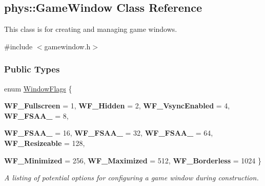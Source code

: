 \hypertarget{classphys_1_1GameWindow}{
\subsection{phys::GameWindow Class Reference}
\label{dc/d4f/classphys_1_1GameWindow}
}


This class is for creating and managing game windows.  




{\ttfamily \#include $<$gamewindow.h$>$}

\subsubsection*{Public Types}
\begin{DoxyCompactItemize}
\item 
enum \hyperlink{classphys_1_1GameWindow_ae4c6f1cc436ac9f20e43bd21a99885f5}{WindowFlags} \{ \par
{\bfseries WF\_\-Fullscreen} =  1, 
{\bfseries WF\_\-Hidden} =  2, 
{\bfseries WF\_\-VsyncEnabled} =  4, 
{\bfseries WF\_\-FSAA\_} =  8, 
\par
{\bfseries WF\_\-FSAA\_} =  16, 
{\bfseries WF\_\-FSAA\_} =  32, 
{\bfseries WF\_\-FSAA\_} =  64, 
{\bfseries WF\_\-Resizeable} =  128, 
\par
{\bfseries WF\_\-Minimized} =  256, 
{\bfseries WF\_\-Maximized} =  512, 
{\bfseries WF\_\-Borderless} =  1024
 \}
\begin{DoxyCompactList}\small\item\em A listing of potential options for configuring a game window during construction. \item\end{DoxyCompactList}\end{DoxyCompactItemize}
